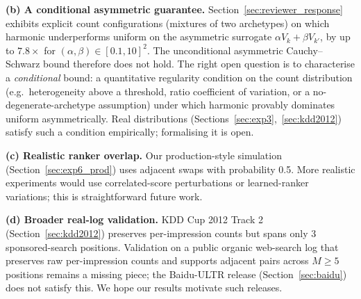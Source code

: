 \documentclass[sigconf]{acmart}
\begin{document}
\textbf{(b) A conditional asymmetric guarantee.}
Section~\ref{sec:reviewer_response} exhibits explicit count configurations (mixtures
of two archetypes) on which harmonic underperforms uniform on the asymmetric
surrogate $\alpha V_k+\beta V_{k'}$, by up to $7.8\times$ for
$(\alpha,\beta)\in[0.1,10]^2$. The unconditional asymmetric Cauchy--Schwarz bound
therefore does not hold. The right open question is to characterise a
\emph{conditional} bound: a quantitative regularity condition on the count
distribution (e.g.\ heterogeneity above a threshold, ratio coefficient of variation,
or a no-degenerate-archetype assumption) under which harmonic provably dominates
uniform asymmetrically. Real distributions
(Sections~\ref{sec:exp3},~\ref{sec:kdd2012}) satisfy such a condition empirically;
formalising it is open.

\textbf{(c) Realistic ranker overlap.}
Our production-style simulation (Section~\ref{sec:exp6_prod}) uses adjacent swaps with
probability 0.5. More realistic experiments would use correlated-score perturbations or
learned-ranker variations; this is straightforward future work.

\textbf{(d) Broader real-log validation.}
KDD Cup 2012 Track 2 (Section~\ref{sec:kdd2012}) preserves per-impression counts but
spans only 3 sponsored-search positions. Validation on a public organic web-search log
that preserves raw per-impression counts and supports adjacent pairs across $M\geq 5$
positions remains a missing piece; the Baidu-ULTR release (Section~\ref{sec:baidu})
does not satisfy this. We hope our results motivate such releases.





\end{document}
